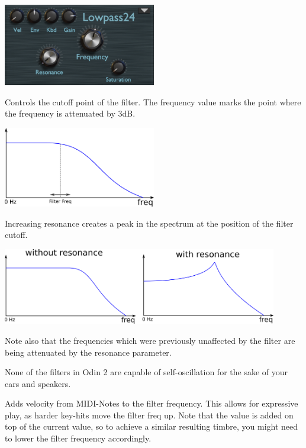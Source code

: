 \begin{center}
    \includegraphics[width=0.5\textwidth]{graphics/lowpass_filter.png}
\end{center}

{Controls the cutoff point of the filter. The frequency value marks the point where the frequency is attenuated by 3dB.

    \begin{center}
        \includegraphics[width=0.5\textwidth]{graphics/filter_freq.png}
    \end{center}
}

{Increasing resonance creates a peak in the spectrum at the position of the filter cutoff.

    \begin{center}
        \includegraphics[width=0.9\textwidth]{graphics/filter_resonance.png}
    \end{center}

    Note also that the frequencies which were previously unaffected by the filter are being attenuated by the resonance parameter.

    None of the filters in Odin 2 are capable of self-oscillation for the sake of your ears and speakers.}

{Adds velocity from MIDI-Notes to the filter frequency. This allows for expressive play, as harder key-hits move the filter freq up. Note that the value is added on top of the current value, so to achieve a similar resulting timbre, you might need to lower the filter frequency accordingly.}


